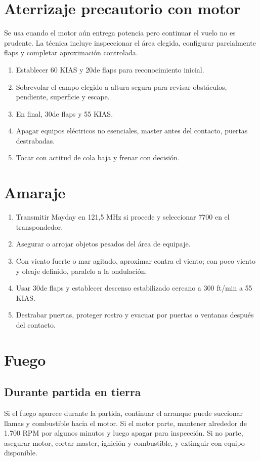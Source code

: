 \documentclass[11pt,oneside]{book}
\newenvironment{checklist}{\begin{enumerate}[label=\arabic*.]}{\end{enumerate}}
\begin{document}
\section{Aterrizaje precautorio con motor}

Se usa cuando el motor aún entrega potencia pero continuar el vuelo no es prudente. La técnica incluye inspeccionar el área elegida, configurar parcialmente flaps y completar aproximación controlada.

\begin{checklist}
\item Establecer 60 KIAS y 20\textdegree de flaps para reconocimiento inicial.
\item Sobrevolar el campo elegido a altura segura para revisar obstáculos, pendiente, superficie y escape.
\item En final, 30\textdegree de flaps y 55 KIAS.
\item Apagar equipos eléctricos no esenciales, master antes del contacto, puertas destrabadas.
\item Tocar con actitud de cola baja y frenar con decisión.
\end{checklist}

\section{Amaraje}

\begin{checklist}
\item Transmitir Mayday en 121,5 MHz si procede y seleccionar 7700 en el transpondedor.
\item Asegurar o arrojar objetos pesados del área de equipaje.
\item Con viento fuerte o mar agitado, aproximar contra el viento; con poco viento y oleaje definido, paralelo a la ondulación.
\item Usar 30\textdegree de flaps y establecer descenso estabilizado cercano a 300 ft/min a 55 KIAS.
\item Destrabar puertas, proteger rostro y evacuar por puertas o ventanas después del contacto.
\end{checklist}

\section{Fuego}

\subsection{Durante partida en tierra}
Si el fuego aparece durante la partida, continuar el arranque puede succionar llamas y combustible hacia el motor. Si el motor parte, mantener alrededor de 1.700 RPM por algunos minutos y luego apagar para inspección. Si no parte, asegurar motor, cortar master, ignición y combustible, y extinguir con equipo disponible.
\end{document}
